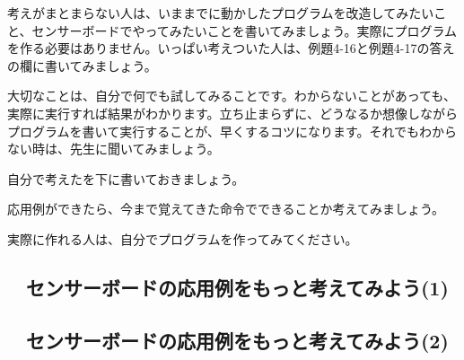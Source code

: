 考えがまとまらない人は、いままでに動かしたプログラムを改造してみたいこと、センサーボードでやってみたいことを書いてみましょう。実際にプログラムを作る必要はありません。いっぱい考えついた人は、例題4-16と例題4-17の答えの欄に書いてみましょう。

大切なことは、自分で何でも試してみることです。わからないことがあっても、実際に実行すれば結果がわかります。立ち止まらずに、どうなるか想像しながらプログラムを書いて実行することが、早くするコツになります。それでもわからない時は、先生に聞いてみましょう。

\exampleanswer

自分で考えたを下に書いておきましょう。

応用例ができたら、今まで覚えてきた命令でできることか考えてみましょう。

実際に作れる人は、自分でプログラムを作ってみてください。


\newpage
\subsection{\useOmetoiExample　センサーボードの応用例をもっと考えてみよう(1)}

\exampleanswer

\newpage
\subsection{\useOmetoiExample　センサーボードの応用例をもっと考えてみよう(2)}

\exampleanswer


